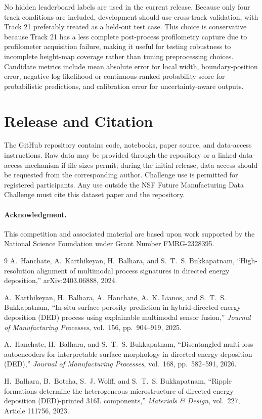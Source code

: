 \documentclass[10pt]{article}
\begin{document}
No hidden leaderboard labels are used in the current release. Because only four track conditions are included, development should use cross-track validation, with Track 21 preferably treated as a held-out test case. This choice is conservative because Track 21 has a less complete post-process profilometry capture due to profilometer acquisition failure, making it useful for testing robustness to incomplete height-map coverage rather than tuning preprocessing choices. Candidate metrics include mean absolute error for local width, boundary-position error, negative log likelihood or continuous ranked probability score for probabilistic predictions, and calibration error for uncertainty-aware outputs.

\section{Release and Citation}
The GitHub repository contains code, notebooks, paper source, and data-access instructions. Raw data may be provided through the repository or a linked data-access mechanism if file sizes permit; during the initial release, data access should be requested from the corresponding author. Challenge use is permitted for registered participants. Any use outside the NSF Future Manufacturing Data Challenge must cite this dataset paper and the repository.

\paragraph{Acknowledgment.}
This competition and associated material are based upon work supported by the National Science Foundation under Grant Number FMRG-2328395.

\begin{thebibliography}{9}
\small
{}
A.~Hanchate, A.~Karthikeyan, H.~Balhara, and S.~T.~S. Bukkapatnam,
``High-resolution alignment of multimodal process signatures in directed energy deposition,''
arXiv:2403.06888, 2024.

A.~Karthikeyan, H.~Balhara, A.~Hanchate, A.~K. Lianos, and S.~T.~S. Bukkapatnam,
``In-situ surface porosity prediction in hybrid-directed energy deposition (DED) process using explainable multimodal sensor fusion,''
\emph{Journal of Manufacturing Processes}, vol.~156, pp.~904--919, 2025.

A.~Hanchate, H.~Balhara, and S.~T.~S. Bukkapatnam,
``Disentangled multi-loss autoencoders for interpretable surface morphology in directed energy deposition (DED),''
\emph{Journal of Manufacturing Processes}, vol.~168, pp.~582--591, 2026.

H.~Balhara, B.~Botcha, S.~J. Wolff, and S.~T.~S. Bukkapatnam,
``Ripple formations determine the heterogeneous microstructure of directed energy deposition (DED)-printed 316L components,''
\emph{Materials \& Design}, vol.~227, Article 111756, 2023.
\end{thebibliography}
\end{document}
